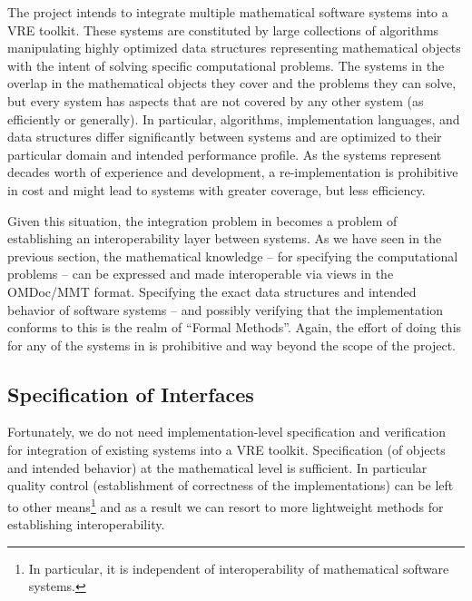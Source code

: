 The \pn project intends to integrate multiple mathematical software systems into a VRE
toolkit. These systems are constituted by large collections of algorithms manipulating
highly optimized data structures representing mathematical objects with the intent of
solving specific computational problems. The systems in the overlap in the mathematical
objects they cover and the problems they can solve, but every system has aspects that are
not covered by any other system (as efficiently or generally). In particular, algorithms,
implementation languages, and data structures differ significantly between systems and are
optimized to their particular domain and intended performance profile. As the systems
represent decades worth of experience and development, a re-implementation is prohibitive
in cost and might lead to systems with greater coverage, but less efficiency.

Given this situation, the integration problem in \pn becomes a problem of establishing an
interoperability layer between systems. As we have seen in the previous section, the
mathematical knowledge -- for specifying the computational problems -- can be expressed
and made interoperable via views in the OMDoc/MMT format. Specifying the exact data
structures and intended behavior of software systems -- and possibly verifying that the
implementation conforms to this is the realm of ``Formal Methods''. Again, the effort of
doing this for any of the systems in \pn is prohibitive and way beyond the scope of the
project.

\subsection{Specification of Interfaces}

Fortunately, we do not need implementation-level specification and verification for
integration of existing systems into a VRE toolkit. Specification (of objects and intended
behavior) at the mathematical level is sufficient. In particular quality control
(establishment of correctness of the implementations) can be left to other
means\footnote{In particular, it is independent of interoperability of mathematical
  software systems.} and as a result we can resort to more lightweight methods for
establishing interoperability. 


